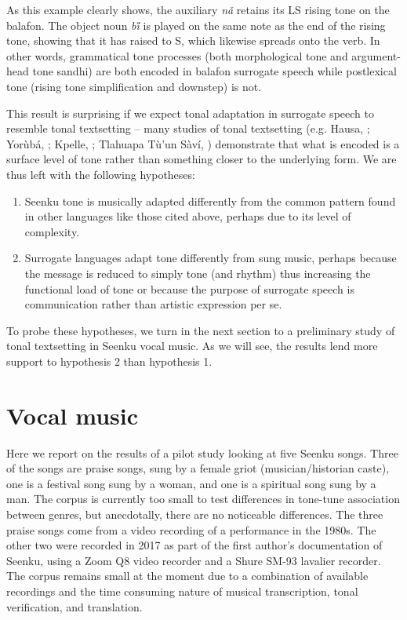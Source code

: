 \documentclass[output=paper]{langscibook}
\begin{document}
As this example clearly shows, the auxiliary \textit{nǎ} retains its LS rising tone on the balafon. The object noun \textit{bi̋} is played on the same note as the end of the rising tone, showing that it has raised to S, which likewise spreads onto the verb. In other words, grammatical tone processes (both morphological tone and argument-head tone sandhi) are both encoded in balafon surrogate speech while postlexical tone (rising tone simplification and downstep) is not. 

This result is surprising if we expect tonal adaptation in surrogate speech to resemble tonal textsetting -- many studies of tonal textsetting (e.g.
Hausa, \citealt{Leben1983};
Yorùbá, \citealt{Villepastour2014};
Kpelle, \citealt{KonoshenkoKuznetsova2015};
Tlahuapa Tù'un Sàví, \citealt{Sleeper2018})
demonstrate that what is encoded is a surface level of tone rather than something closer to the underlying form. We are thus left with the following hypotheses:

\begin{enumerate}
  \item Seenku tone is musically adapted differently from the common pattern found in other languages like those cited above, perhaps due to its level of complexity.
  \item Surrogate languages adapt tone differently from sung music, perhaps because the message is reduced to simply tone (and rhythm) thus increasing the functional load of tone or because the purpose of surrogate speech is communication rather than artistic expression per se.
\end{enumerate}

To probe these hypotheses, we turn in the next section to a preliminary study of tonal textsetting in Seenku vocal music. As we will see, the results lend more support to hypothesis 2 than hypothesis 1. 

\section{Vocal music}\label{sec-vocal}

Here we report on the results of a pilot study looking at five Seenku songs. Three of the songs are praise songs, sung by a female griot (musician/historian caste), one is a festival song sung by a woman, and one is a spiritual song sung by a man. The corpus is currently too small to test differences in tone-tune association between genres, but anecdotally, there are no noticeable differences. The three praise songs come from a video recording of a performance in the 1980s. The other two were recorded in 2017 as part of the first author's documentation of Seenku, using a Zoom Q8 video recorder and a Shure SM-93 lavalier recorder. The corpus remains small at the moment due to a combination of available recordings and the time consuming nature of musical transcription, tonal verification, and translation. 
\end{document}
